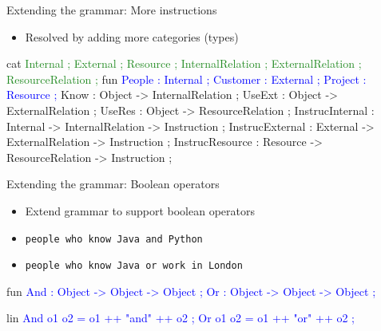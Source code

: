\begin{frame}[fragile]{Extending the grammar: More instructions}
\begin{itemize}
\item Resolved by adding more categories (types)
\end{itemize}

\vspace{-4mm}\begin{semiverbatim}\small
cat \textcolor{ForestGreen}{
  Internal ; External ; Resource ;
  InternalRelation ; ExternalRelation ; ResourceRelation ; }\pause
fun \textcolor{Blue}{
  People   : Internal ;
  Customer : External ;
  Project  : Resource ; }\pause
  \textcolor{Type}{
  Know     : Object -> InternalRelation ;
  UseExt   : Object -> ExternalRelation ;
  UseRes   : Object -> ResourceRelation ;}\pause
  \textcolor{String}{
  InstrucInternal : Internal -> InternalRelation -> Instruction ;
  InstrucExternal : External -> ExternalRelation -> Instruction ;
  InstrucResource : Resource -> ResourceRelation -> Instruction ; }
\end{semiverbatim}
\end{frame}
\begin{frame}[fragile]{Extending the grammar: Boolean operators}\pause
\begin{itemize}
  \item Extend grammar to support boolean operators
  \item \texttt{people who know Java and Python} \pause
  \item \texttt{people who know Java or work in London} \pause
\end{itemize}
\begin{semiverbatim}
fun \textcolor{Blue}{
  And : Object -> Object -> Object ;
  Or : Object -> Object -> Object ;}
\end{semiverbatim}

\begin{semiverbatim}
lin\textcolor{Blue}{
  And o1 o2 = o1 ++ \textcolor{String}{"and"} ++ o2 ;
  Or o1 o2 = o1 ++ \textcolor{String}{"or"} ++ o2 ;}
\end{semiverbatim}
\end{frame}
%                  
